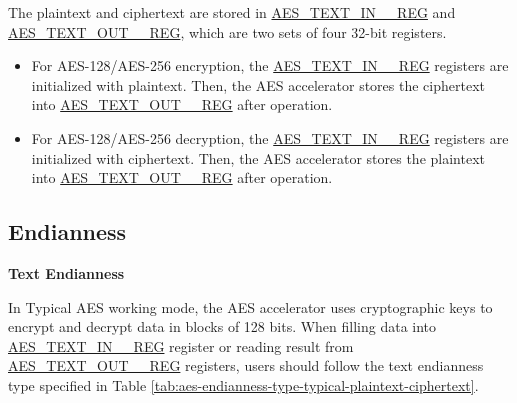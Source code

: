 \documentclass[main\_\_EN.tex]{subfiles}
\begin{document}
The plaintext and ciphertext are stored in \hyperref[regdesc:AESTEXTINnREG]{AES\_TEXT\_IN\_\_REG} and \hyperref[regdesc:AESTEXTOUTnREG]{AES\_TEXT\_OUT\_\_REG}, which are two sets of four 32-bit registers.

\begin{itemize}
    \item For AES-128/AES-256 encryption, the \hyperref[regdesc:AESTEXTINnREG]{AES\_TEXT\_IN\_\_REG} registers are initialized with plaintext. Then, the AES accelerator stores the ciphertext into \hyperref[regdesc:AESTEXTOUTnREG]{AES\_TEXT\_OUT\_\_REG} after operation.
    \item For AES-128/AES-256 decryption, the \hyperref[regdesc:AESTEXTINnREG]{AES\_TEXT\_IN\_\_REG} registers are initialized with ciphertext. Then, the AES accelerator stores the plaintext into \hyperref[regdesc:AESTEXTOUTnREG]{AES\_TEXT\_OUT\_\_REG} after operation.
\end{itemize}


\subsection{Endianness}

\textbf{Text Endianness}

In Typical AES working mode, the AES accelerator uses cryptographic keys to encrypt and decrypt data in blocks of 128 bits. 
When filling data into \hyperref[regdesc:AESTEXTINnREG]{AES\_TEXT\_IN\_\_REG} register or reading result from \hyperref[regdesc:AESTEXTINnREG]{AES\_TEXT\_OUT\_\_REG} registers, users should follow the text endianness type specified in Table \ref{tab:aes-endianness-type-typical-plaintext-ciphertext}.

\end{document}
